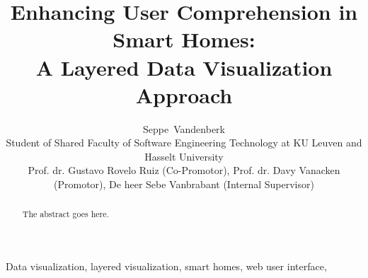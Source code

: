 \documentclass[journal]{IEEEtran}
\begin{document}
%
\title{Enhancing User Comprehension in Smart Homes: \\ A Layered Data Visualization Approach}
%
%
%

\author{Seppe~Vandenberk \\
        Student of Shared Faculty of Software Engineering Technology at KU Leuven and Hasselt University \\
        Prof. dr. Gustavo Rovelo Ruiz (Co-Promotor), Prof. dr. Davy Vanacken (Promotor), De heer Sebe Vanbrabant (Internal Supervisor) %
    }

\maketitle

\begin{abstract}
The abstract goes here.
\end{abstract}

\begin{IEEEkeywords}
Data visualization, layered visualization, smart homes, web user interface, 
\end{IEEEkeywords}






%
\IEEEpeerreviewmaketitle
\end{document}
